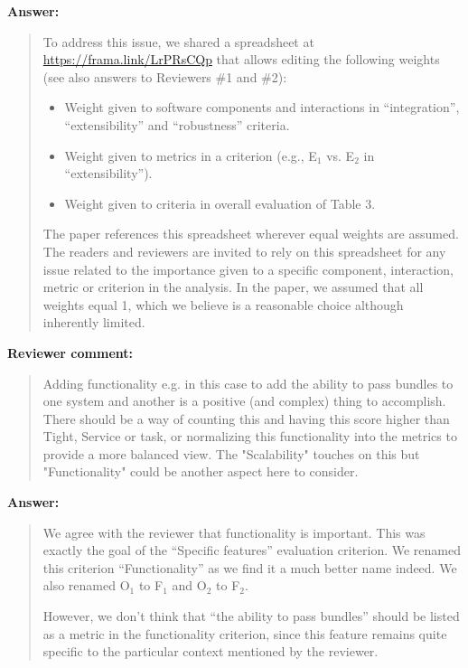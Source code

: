 \documentclass[a4]{article}
\newenvironment{review}%
{\textbf{Reviewer comment:}\begin{quote}}%
{\end{quote}}%
\newenvironment{answer}%
{\textbf{Answer:}\begin{small}\begin{quote}}%
{\end{quote}\end{small}}%
\begin{document}
\begin{answer}
To address this issue, we
  shared a spreadsheet at \url{https://frama.link/LrPRsCQp} that
  allows editing the following weights (see also answers to Reviewers \#1 and \#2):
  \begin{itemize}
  \item Weight given to software components and interactions in
  ``integration'', ``extensibility'' and ``robustness'' criteria.
  \item Weight given to metrics in a criterion (e.g., E$_1$ vs. E$_2$ in
  ``extensibility'').
  \item Weight given to criteria in overall evaluation of Table 3.
\end{itemize}
The paper references this spreadsheet wherever equal weights are
assumed. The readers and reviewers are invited to rely on this
spreadsheet for any issue related to the importance given to a
specific component, interaction, metric or criterion in the
analysis. In the paper, we assumed that all weights equal 1, which we
believe is a reasonable choice although inherently limited.
\end{answer}

\begin{review}
  Adding functionality e.g. in this case to add the ability to pass
  bundles to one system and another is a positive (and complex) thing
  to accomplish. There should be a way of counting this and having
  this score higher than Tight, Service or task, or normalizing this
  functionality into the metrics to provide a more balanced view. The
  "Scalability" touches on this but "Functionality" could be another
  aspect here to consider.
\end{review}

\begin{answer}
  We agree with the reviewer that functionality is important. This was
  exactly the goal of the ``Specific features'' evaluation
  criterion. We renamed this criterion ``Functionality'' as we find it
  a much better name indeed. We also renamed O$_1$ to F$_1$ and O$_2$
  to F$_2$. 

  However, we don't think that ``the ability to pass bundles'' should
  be listed as a metric in the functionality criterion, since this
  feature remains quite specific to the particular context mentioned
  by the reviewer. 
\end{answer}
\end{document}
